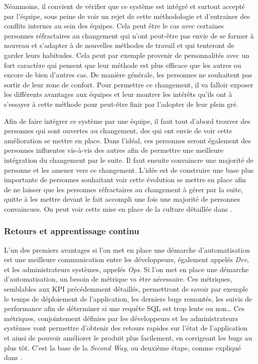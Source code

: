 
Néanmoins, il convient de vérifier que ce système est intégré et surtout accepté par l'équipe, sous peine de voir un rejet de cette méthodologie \devops{} et d'entrainer des conflits internes au sein des équipes. Cela peut être le cas avec certaines personnes réfractaires au changement qui n'ont peut-être pas envie de se former à nouveau et s'adapter à de nouvelles méthodes de travail et qui tenteront de garder leurs habitudes. Cela peut par exemple provenir de personnalités avec un fort caractère qui pensent que leur méthode est plus efficace que les autres ou encore de bien d'autres cas. De manière générale, les personnes ne souhaitent pas sortir de leur zone de confort. Pour permettre ce changement, il va falloir exposer les différents avantages aux équipes et leur montrer les intérêts qu'ils ont à s'essayer à cette méthode pour peut-être finir par l'adopter de leur plein gré. 

Afin de faire intégrer ce système par une équipe, il faut tout d'abord trouver des personnes qui sont ouvertes au changement, des  qui ont envie de voir cette amélioration se mettre en place. Dans l'idéal, ces personnes seront également des personnes influentes vis-à-vis des autres afin de permettre une meilleure intégration du changement par le suite. Il faut ensuite convaincre une majorité de personne et les amener vers ce changement. L'idée est de construire une base plus importante de personnes souhaitant voir cette évolution se mettre en place afin de ne laisser que les personnes réfractaires au changement à gérer par la suite, quitte à les mettre devant le fait accompli une fois une majorité de personnes convaincues. On peut voir cette mise en place de la culture \devops{} détaillée dans  \cite[p.58-59]{devOpsHandbook}.

\subsubsection{Retours et apprentissage continu}

L'un des premiers avantages si l'on met en place une démarche d'automatisation est une meilleure communication entre les développeurs, également appelés \emph{Dev}, et les administrateurs systèmes, appelés \emph{Ops}. Si l'on met en place une démarche d'automatisation, un besoin de métrique va être nécessaire. Ces métriques, semblables aux \gls{KPI} précédemment détaillés, permettront de savoir par exemple le temps de déploiement de l'application, les derniers bugs remontés, les suivis de performance afin de déterminer si une requête \gls{SQL} est trop lente ou non\ldots{} Ces métriques, conjointement définies par les développeurs et les administrateurs systèmes vont permettre d'obtenir des retours rapides sur l'état de l'application et ainsi de pouvoir améliorer le produit plus facilement, en corrigeant les bugs au plus tôt. C'est la base de la \emph{Second Way}, ou deuxième étape, comme expliqué dans  \cite[p.405-410]{phoenixProject}.

